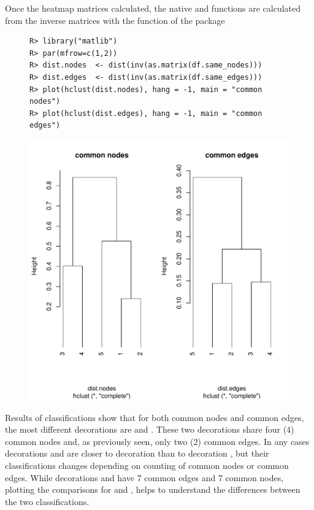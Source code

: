 \documentclass[article]{jss}\usepackage{knitr}
\begin{document}
Once the heatmap matrices calculated, the native  and  functions \citep{R19} are calculated from the inverse matrices with the function  of the  package \citep{Friendly20}

\begin{figure}[H]
\begin{kframe}
\begin{verbatim}
R> library("matlib")
R> par(mfrow=c(1,2))
R> dist.nodes  <- dist(inv(as.matrix(df.same_nodes)))
R> dist.edges  <- dist(inv(as.matrix(df.same_edges)))
R> plot(hclust(dist.nodes), hang = -1, main = "common nodes")
R> plot(hclust(dist.edges), hang = -1, main = "common edges")
\end{verbatim}
\end{kframe}
\includegraphics[width=\maxwidth]{figure/unnamed-chunk-10-1} 

\end{figure}

Results of classifications show that for both common nodes and common edges, the most different decorations are  and . These two decorations share four (4) common nodes and, as previously seen, only two (2) common edges.
In any cases decorations  and  are closer to decoration  than to decoration , but their classifications changes depending on counting of common nodes or common edges. While decorations  and  have 7 common edges and 7 common nodes, plotting the comparisons for  and , helps to understand the differences between the two classifications.
\end{document}
